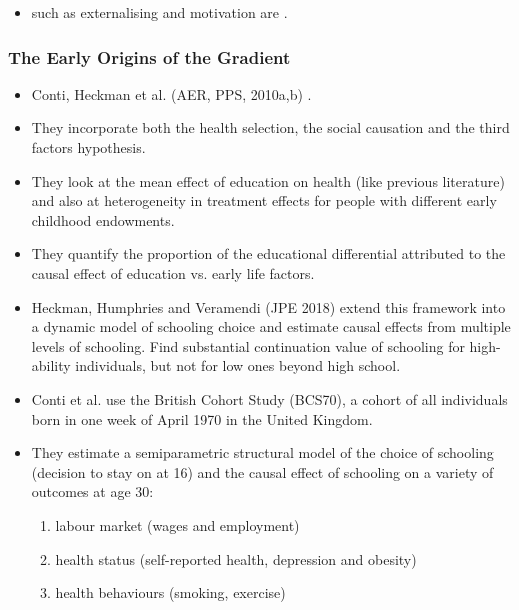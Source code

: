 \begin{itemize}
        \item {} such as externalising and motivation are .
\end{itemize}

\subsubsection{The Early Origins of the Gradient}

\begin{itemize}
        \item Conti, Heckman et al. (AER, PPS, 2010a,b) .
        \item They incorporate both the health selection, the social causation and the third factors hypothesis.
        \item They look at the mean effect of education on health (like previous literature) and also at heterogeneity in treatment effects for people with different early childhood endowments.
        \item They quantify the proportion of the educational differential attributed to the causal effect of education vs. early life factors. 
        \item Heckman, Humphries and Veramendi (JPE 2018) extend this framework into a dynamic model of schooling choice and estimate causal effects from multiple levels of schooling. Find substantial continuation value of schooling for high-ability individuals, but not for low ones beyond high school.
        \item Conti et al. use the British Cohort Study (BCS70), a cohort of all individuals born in one week of April 1970 in the United Kingdom.
        \item They estimate a semiparametric structural model of the choice of schooling (decision to stay on at 16) and the causal effect of schooling on a variety of outcomes at age 30: 
        \begin{enumerate}
            \item labour market (wages and employment)
            \item health status (self-reported health, depression and obesity)
            \item health behaviours (smoking, exercise)

\end{enumerate}
\end{itemize}
